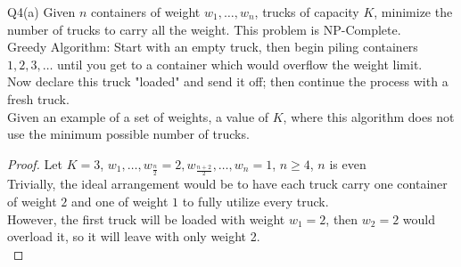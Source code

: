 \begin{problem}
    {Q4(a)}
    Given $n$ containers of weight $w_1, \dots, w_n$, trucks of capacity $K$, minimize the number of trucks to carry all the weight. This problem is NP-Complete. \\
    Greedy Algorithm: Start with an empty truck, then begin piling containers $1, 2, 3, \dots$ until you get to a container which would overflow the weight limit. \\
    Now declare this truck "loaded" and send it off; then continue the process with a fresh truck. \\
    Given an example of a set of weights, a value of $K$, where this algorithm does not use the minimum possible number of trucks. \\
    \begin{proof}
        Let $K = 3$, $w_1, \dots, w_{\frac{n}{2}} = 2, w_{\frac{n+2}{2}}, \dots, w_n = 1$, $n \geq 4$, $n$ is even \\
        Trivially, the ideal arrangement would be to have each truck carry one container of weight $2$ and one of weight $1$ to fully utilize every truck. \\
        However, the first truck will be loaded with weight $w_1 = 2$, then $w_2 = 2$ would overload it, so it will leave with only weight 2. \\
    \end{proof}
\end{problem}
